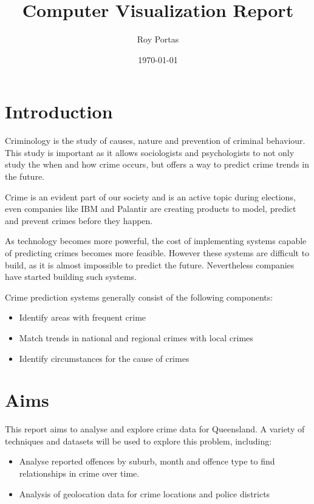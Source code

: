 \documentclass[]{article}
\begin{document}
\title{Computer Visualization Report}
\author{Roy Portas}
\date{\today}
\maketitle

\section{Introduction}

Criminology is the study of causes, nature and prevention of criminal behaviour\cite{roufa_early_nodate}.
This study is important as it allows sociologists and psychologists to not only study the when and how crime occurs, but offers a way to predict crime trends in the future.

Crime is an evident part of our society and is an active topic during elections\cite{remeikis_queensland_2016}, even companies like IBM\cite{noauthor_ibm_2012} and Palantir\cite{palantir_technologies_law_nodate} 
are creating products to model, predict and prevent crimes before they happen.

As technology becomes more powerful, the cost of implementing systems capable of predicting crimes becomes more feasible.
However these systems are difficult to build, as it is almost impossible to predict the future.
Nevertheless companies have started building such systems.

Crime prediction systems generally consist of the following components:
\begin{itemize}
    \item Identify areas with frequent crime\cite{noauthor_ibm_2012}
    \item Match trends in national and regional crimes with local crimes
    \item Identify circumstances for the cause of crimes\cite{noauthor_ibm_2012}
\end{itemize}

\section{Aims}

This report aims to analyse and explore crime data for Queensland. A variety of techniques and datasets will be used to explore this problem, including:

\begin{itemize}
    \item Analyse reported offences by suburb, month and offence type to find relationships in crime over time.
    \item Analysis of geolocation data for crime locations and police districts
\end{itemize}
\end{document}
